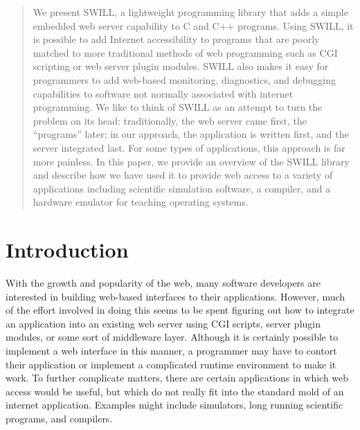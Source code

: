 \author{Sotiria Lampoudi and David M. Beazley \\
{\em Department of Computer Science} \\
{\em University of Chicago }\\
{\em Chicago, Illinois 60637 }\\
{\tt \{slampoud,beazley\}@cs.uchicago.edu }}

\maketitle

\thispagestyle{empty}
\pagestyle{empty}

\begin{abstract}

We present SWILL, a lightweight programming library that adds a simple
embedded web server capability to C and C++ programs.  Using SWILL, it
is possible to add Internet accessibility to programs that are poorly
matched to more traditional methods of web programming such as CGI
scripting or web server plugin modules.  SWILL also makes it easy for
programmers to add web-based monitoring, diagnostics, and debugging
capabilities to software not normally associated with internet
programming.  
We like to think of SWILL as an attempt to turn
the problem on its head: traditionally, the web server came first, the 
``programs'' later; in our approach, the application is written first, and the 
server integrated last. For some types of applications, this 
approach is far more painless.
In this paper, we provide an overview of the SWILL 
library and describe how we have used it to provide web access to a 
variety of applications including scientific simulation software, 
a compiler, and a hardware emulator for teaching operating systems.

\end{abstract}

\section{Introduction}

With the growth and popularity of the web, many software developers
are interested in building web-based interfaces to their applications.
However, much of the effort involved in doing this seems to be spent figuring
out how to integrate an application into an existing web server using
CGI scripts, server plugin modules, or some sort of middleware
layer. Although it is certainly possible to implement a web interface
in this manner, a programmer may have to contort their application or
implement a complicated runtime environment to make it work. To
further complicate matters, there are certain applications in which
web access would be useful, but which do not really fit into the standard mold
of an internet application.  Examples might include simulators, long
running scientific programs, and compilers. 

